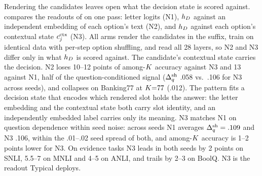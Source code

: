 \label{sec:analysis:readout}
Rendering the candidates leaves open what the decision state is scored against. 
compares the readouts of  on one pass: letter logits (N1), $h_D$ against an
independent embedding of each option's text (N2), and $h_D$ against each option's contextual state
$c^{\mathrm{ctx}}_{j}$ (N3). All arms render the candidates in the suffix, train on identical data with per-step
option shuffling, and read all 28 layers, so N2 and N3 differ only in what $h_D$ is scored against. The candidate's
contextual state carries the decision. N2 loses 10--12 points of among-$K$
accuracy against N3 and 13 against N1, half of the question-conditioned signal ($\Delta_q^{\mathrm{sh}}$ .058 vs.\ .106
for N3 across seeds), and collapses on Banking77 at $K{=}77$ (.012). The pattern fits a decision
state that encodes which rendered slot holds the answer: the letter embedding and the contextual state
both carry slot identity, and an independently embedded label carries only its meaning. N3 matches N1 on
question dependence within seed noise: across seeds N1 averages $\Delta_q^{\mathrm{sh}} = .109$ and N3 .106, within the
.01--.02 seed spread of both, and among-$K$ accuracy is 1--2 points lower for N3. On evidence tasks N3 leads in
both seeds by 2 points on SNLI, 5.5--7 on MNLI and 4--5 on ANLI, and trails by 2--3 on BoolQ. N3 is the
readout Typical deploys.

